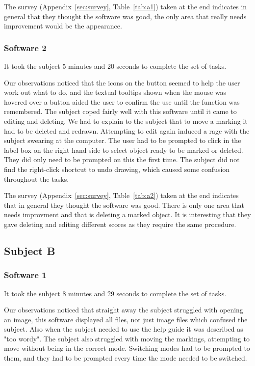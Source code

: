 \documentclass[a4paper,11pt,oneside]{article}
\begin{document}
The survey (Appendix~\ref{sec:survey}, Table~\ref{tab:a1}) taken at the end indicates in general that they thought the software was good, the only area that really needs improvement would be the appearance.

\subsubsection{Software 2}
It took the subject 5 minutes and 20 seconds to complete the set of tasks.

Our observations noticed that the icons on the button seemed to help the user work out what to do, and the textual tooltips shown when the mouse was hovered over a button aided the user to confirm the use until the function was remembered.  The subject coped fairly well with this software until it came to editing and deleting.  We had to explain to the subject that to move a marking it had to be deleted and redrawn.  Attempting to edit again induced a rage with the subject swearing at the computer.  The user had to be prompted to click in the label box on the right hand side to select object ready to be marked or deleted.  They did only need to be prompted on this the first time. The subject did not find the right-click shortcut to undo drawing, which caused some confusion throughout the tasks.

The survey (Appendix~\ref{sec:survey}, Table~\ref{tab:a2}) taken at the end indicates that in general they thought the software was good.  There is only one area that needs improvment and that is deleting a marked object.  It is interesting that they gave deleting and editing different scores as they require the same procedure.

\subsection{Subject B}
\subsubsection{Software 1}
It took the subject 8 minutes and 29 seconds to complete the set of tasks.

Our observations noticed that straight away the subject struggled with opening an image, this software displayed all files, not just image files which confused the subject.  Also when the subject needed to use the help guide it was described as "too wordy".  The subject also struggled with moving the markings, attempting to move without being in the correct mode.  Switching modes had to be prompted to them, and they had to be prompted every time the mode needed to be switched.
\end{document}

